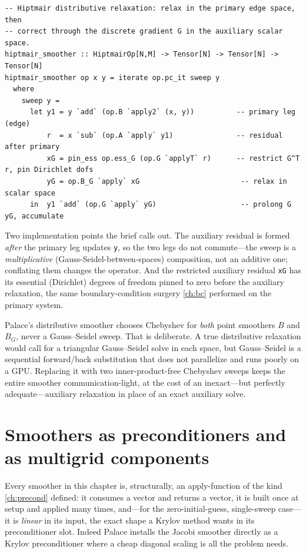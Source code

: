\begin{lstlisting}[style=l4style]
-- Hiptmair distributive relaxation: relax in the primary edge space, then
-- correct through the discrete gradient G in the auxiliary scalar space.
hiptmair_smoother :: HiptmairOp[N,M] -> Tensor[N] -> Tensor[N] -> Tensor[N]
hiptmair_smoother op x y = iterate op.pc_it sweep y
  where
    sweep y =
      let y1 = y `add` (op.B `apply2` (x, y))          -- primary leg (edge)
          r  = x `sub` (op.A `apply` y1)               -- residual after primary
          xG = pin_ess op.ess_G (op.G `applyT` r)      -- restrict G^T r, pin Dirichlet dofs
          yG = op.B_G `apply` xG                        -- relax in scalar space
      in  y1 `add` (op.G `apply` yG)                    -- prolong G yG, accumulate
\end{lstlisting}

Two implementation points the brief calls out. The auxiliary residual is formed
\emph{after} the primary leg updates \lstinline[style=l4style]|y|, so the two legs
do not commute---the sweep is a \emph{multiplicative} (Gauss-Seidel-between-spaces)
composition, not an additive one; conflating them changes the operator. And the
restricted auxiliary residual \lstinline[style=l4style]|xG| has its essential
(Dirichlet) degrees of freedom pinned to zero before the auxiliary relaxation, the
same boundary-condition surgery \cref{ch:bc} performed on the primary system.

\begin{notationbox}
Palace's distributive smoother chooses Chebyshev for \emph{both} point smoothers
$B$ and $B_G$, never a Gauss--Seidel sweep. That is deliberate. A true distributive
relaxation would call for a triangular Gauss--Seidel solve in each space, but
Gauss--Seidel is a sequential forward/back substitution that does not parallelize
and runs poorly on a GPU. Replacing it with two inner-product-free Chebyshev sweeps
keeps the entire smoother communication-light, at the cost of an inexact---but
perfectly adequate---auxiliary relaxation in place of an exact auxiliary solve.
\end{notationbox}

\section{Smoothers as preconditioners and as multigrid components}
\label{sec:smoo-ascomponents}

Every smoother in this chapter is, structurally, an apply-function of the kind
\cref{ch:precond} defined: it consumes a vector and returns a vector, it is built
once at setup and applied many times, and---for the zero-initial-guess, single-sweep
case---it is \emph{linear} in its input, the exact shape a Krylov method wants in its
preconditioner slot. Indeed Palace installs the Jacobi smoother directly as a Krylov
preconditioner where a cheap diagonal scaling is all the problem needs.

